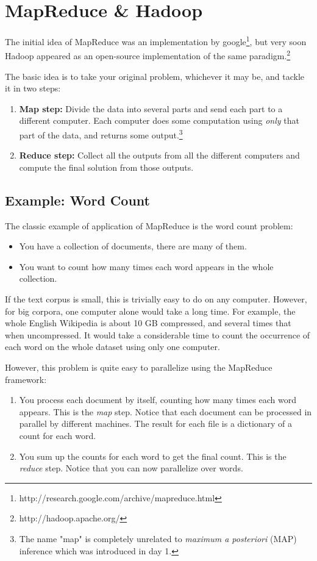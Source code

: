 \section{MapReduce \& Hadoop}

The initial idea of MapReduce was an implementation by google\footnote{http://research.google.com/archive/mapreduce.html}, but very soon
Hadoop appeared as an open-source implementation of the same paradigm.\footnote{http://hadoop.apache.org/}

The basic idea is to take your original problem, whichever it may be, and tackle it in two steps:
%
\begin{enumerate}
\item \textbf{Map step:} Divide the data into several parts and send each part to a different computer. Each computer does some computation using \emph{only} that part of the data, and returns some output.\footnote{The name "map" is completely unrelated to \emph{maximum a posteriori} (MAP) inference which was introduced in day 1.}
\item \textbf{Reduce step:} Collect all the outputs from all the different computers and compute the final solution from those outputs.
\end{enumerate}

\subsection{Example: Word Count}

The classic example of application of MapReduce is the word count problem:

\begin{itemize}
\item You have a collection of documents, there are many of them.
\item You want to count how many times each word appears in the whole collection.
\end{itemize}

If the text corpus is small, this is trivially easy to do on any computer. However, for big corpora, one computer alone would take a long time. For example, the whole English Wikipedia is about 10 GB compressed, and several times that when uncompressed. It would take a considerable time to count the occurrence of each word on the whole dataset using only one computer.

However, this problem is quite easy to parallelize using the MapReduce framework:

\begin{enumerate}
\item You process each document by itself, counting how many times each word
appears. This is the \emph{map} step. Notice that each document can be
processed in parallel by different machines. The result for each file is a
dictionary of a count for each word.
\item You sum up the counts for each word to get the final count. This is the
\emph{reduce} step. Notice that you can now parallelize over words.
\end{enumerate}

